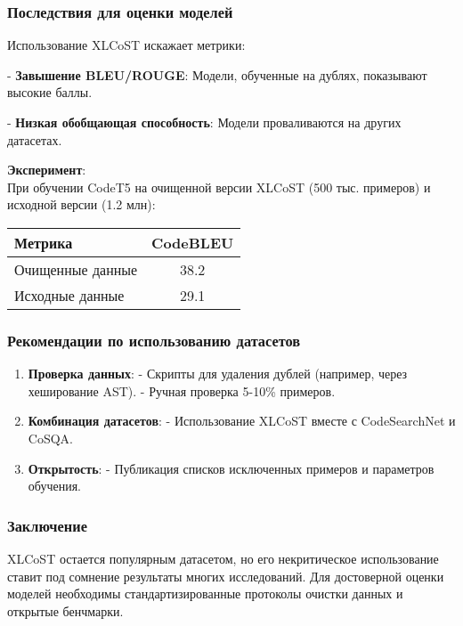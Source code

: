 \subsubsection{Последствия для оценки моделей}

Использование XLCoST искажает метрики:

    
- \textbf{Завышение BLEU/ROUGE}: Модели, обученные на дублях, показывают высокие баллы.
    
- \textbf{Низкая обобщающая способность}: Модели проваливаются на других датасетах.


\textbf{Эксперимент}: \\
При обучении CodeT5 на очищенной версии XLCoST (500 тыс. примеров) и исходной версии (1.2 млн):
\begin{center}
\begin{tabular}{|l|c|}
\hline
\textbf{Метрика} & \textbf{CodeBLEU} \\ \hline
Очищенные данные & 38.2 \\ \hline
Исходные данные & 29.1 \\ \hline
\end{tabular}
\end{center}

\subsubsection{Рекомендации по использованию датасетов}

\begin{enumerate}
    \item \textbf{Проверка данных}:  
      - Скрипты для удаления дублей (например, через хеширование AST).  
      - Ручная проверка 5-10\% примеров.
    \item \textbf{Комбинация датасетов}:  
      - Использование XLCoST вместе с CodeSearchNet и CoSQA.
    \item \textbf{Открытость}:  
      - Публикация списков исключенных примеров и параметров обучения.
\end{enumerate}

\subsubsection{Заключение}

XLCoST остается популярным датасетом, но его некритическое использование ставит под сомнение результаты многих исследований. Для достоверной оценки моделей необходимы стандартизированные протоколы очистки данных и открытые бенчмарки.

